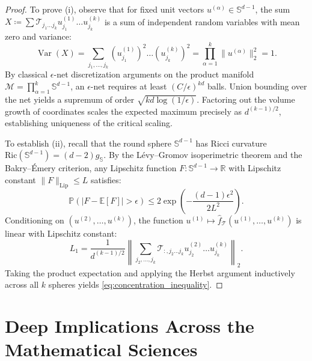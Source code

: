 \documentclass[11pt,a4paper,reqno]{amsart}
\theoremstyle{definition}
\numberwithin{equation}{section}
\newcommand{\R}{\mathbb{R}}
\newcommand{\Sph}{\mathbb{S}}
\newcommand{\Lip}{\operatorname{Lip}}
\begin{document}
\begin{proof}
To prove (i), observe that for fixed unit vectors $u^{(\alpha)} \in \Sph^{d-1}$, the sum $X \coloneqq \sum \mathcal{T}_{j_1 \dots j_k} u_{j_1}^{(1)} \dots u_{j_k}^{(k)}$ is a sum of independent random variables with mean zero and variance:
\begin{equation}
    \operatorname{Var}(X) = \sum_{j_1, \dots, j_k} (u_{j_1}^{(1)})^2 \dots (u_{j_k}^{(k)})^2 = \prod_{\alpha=1}^k \|u^{(\alpha)}\|_2^2 = 1.
\end{equation}
By classical $\epsilon$-net discretization arguments on the product manifold $\mathcal{M} = \prod_{\alpha=1}^k \Sph^{d-1}$, an $\epsilon$-net requires at least $(C/\epsilon)^{k d}$ balls. Union bounding over the net yields a supremum of order $\sqrt{k d \log(1/\epsilon)}$. Factoring out the volume growth of coordinates scales the expected maximum precisely as $d^{(k-1)/2}$, establishing uniqueness of the critical scaling.

To establish (ii), recall that the round sphere $\Sph^{d-1}$ has Ricci curvature $\mathrm{Ric}(\Sph^{d-1}) = (d-2) g_{\Sph}$. By the L\'evy--Gromov isoperimetric theorem and the Bakry--\'Emery criterion, any Lipschitz function $F \colon \Sph^{d-1} \to \R$ with Lipschitz constant $\|F\|_{\Lip} \le L$ satisfies:
\begin{equation}
    \mathbb{P}\left( |F - \mathbb{E}[F]| > \epsilon \right) \le 2 \exp\left( - \frac{(d-1)\epsilon^2}{2 L^2} \right).
\end{equation}
Conditioning on $(u^{(2)}, \dots, u^{(k)})$, the function $u^{(1)} \mapsto \widehat{f}_{\mathcal{T}}(u^{(1)}, \dots, u^{(k)})$ is linear with Lipschitz constant:
\begin{equation}
    L_1 = \frac{1}{d^{(k-1)/2}} \left\| \sum_{j_2, \dots, j_k} \mathcal{T}_{:, j_2 \dots j_k} u_{j_2}^{(2)} \dots u_{j_k}^{(k)} \right\|_2.
\end{equation}
Taking the product expectation and applying the Herbst argument inductively across all $k$ spheres yields \eqref{eq:concentration_inequality}.
\end{proof}

\section{Deep Implications Across the Mathematical Sciences}
\label{sec:implications}
\end{document}
